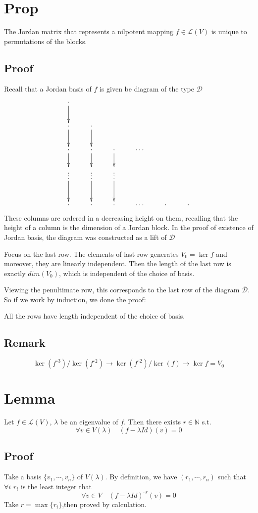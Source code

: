\documentclass{book}
\begin{document}
\section{Prop}
The Jordan matrix that represents a nilpotent mapping $f\in \mathscr{L}(V)$ is unique to permutations of the blocks.
\subsection*{Proof}
Recall that a Jordan basis of $f$ is given be diagram of the type $\mathcal{D}$
$$\xymatrix{
    \cdot\ar[d]&&&&\\
    \cdot\ar[d]&\cdot\ar[d]&&\\
    \cdot\ar[d]&\cdot\ar[d]&\cdot\ar[d]&\cdots&\\
    \vdots\ar[d]&\vdots\ar[d]&\vdots\ar[d]&&\\
	\cdot&\cdot&\cdot&\cdots&\cdot&\cdot
}$$
These columns are ordered in a decreasing height on them, recalling that the height of a column is the dimension of a Jordan block. In the proof of existence of Jordan basis, the diagram was constructed as a lift of $\mathcal{D}$

Focus on the last row. The elements of last row generates $V_0=\ker f$ and moreover, they are linearly independent. Then the length of the last row is exactly $dim(V_0)$, which is independent of the choice of basis.

Viewing the penultimate row, this corresponds to the last row of the diagram $\overline{\mathcal{D}}$. So if we work by induction, we done the proof:

All the rows have length independent of the choice of basis.
\subsection*{Remark}
$$\ker(f^{\circ 3})/\ker(f^{\circ2})\rightarrow\ker(f^{\circ 2})/\ker(f)\rightarrow\ker f=V_0$$
\section{Lemma}
\label{Lemma 48.34}
Let $f\in \mathscr{L}(V)$, $\lambda$ be an eigenvalue of $f$. Then there exists $r\in \mathbb{N}$ s.t.$$\forall v\in V(\lambda)\quad (f-\lambda Id)(v)=0$$
\subsection*{Proof}
Take a basis $\{v_1,\cdots,v_n\}$ of $V(\lambda)$. By definition, we have $(r_1,\cdots,r_n)$ such that $\forall i$ $r_i$ is the least integer that $$\forall v\in V\quad (f-\lambda Id)^{\circ r}(v)=0$$
Take $r=\max\{r_i\}$,then proved by calculation.
\end{document}
